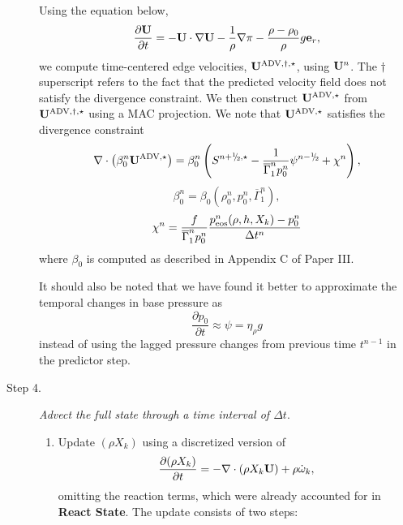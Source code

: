 \documentclass{aastex62}
\newcommand{\sfrac}[2]{\mathchoice
  {\kern0em\raise.5ex\hbox{\the\scriptfont0 #1}\kern-.15em/
   \kern-.15em\lower.25ex\hbox{\the\scriptfont0 #2}}
  {\kern0em\raise.5ex\hbox{\the\scriptfont0 #1}\kern-.15em/
   \kern-.15em\lower.25ex\hbox{\the\scriptfont0 #2}}
  {\kern0em\raise.5ex\hbox{\the\scriptscriptfont0 #1}\kern-.2em/
   \kern-.15em\lower.25ex\hbox{\the\scriptscriptfont0 #2}}
  {#1\!/#2}}
\newcommand{\myhalf}{\sfrac{1}{2}}
\newcommand{\eb}{{\bf{e}}}
\newcommand{\Ub}{{\bf{U}}}
\newcommand{\dt}{\Delta t}
\newcommand{\omegadot}{\dot\omega}
\newcommand{\nph}{{n+\myhalf}}
\newcommand{\uadvone}{\Ub^{\mathrm{ADV},\star}}
\newcommand{\uadvonedag}{\Ub^{\mathrm{ADV},\dagger,\star}}
\begin{document}
\begin{description}
Using the equation below,
%
\begin{equation}
\frac{\partial\Ub}{\partial t} = -\Ub\cdot\nabla\Ub - \frac{1}{\rho}\nabla\pi - \frac{\rho-\rho_0}{\rho}g\eb_r, \label{eq:u_update}
\end{equation}
%
we compute time-centered edge velocities, $\uadvonedag$, using
$\Ub^n$.  The $\dagger$ superscript refers to the
fact that the predicted velocity field does not satisfy the divergence
constraint.  We then construct $\uadvone$ from $\uadvonedag$
using a MAC projection.
We note that $\uadvone$ satisfies the divergence constraint
\begin{equation}
\nabla \cdot \left(\beta_0^n \uadvone\right) = \beta_0^n \left(S^{\nph,\star} - \frac{1}{\overline{\Gamma}_1^np_0^n}\psi^{n-\myhalf} + \chi^n \right),
\end{equation}
\begin{equation}
 \beta_0^n = \beta_0 \left(\rho_0^n, p_0^n, \overline{\Gamma}_1^n\right),
\end{equation}
\begin{equation}
\chi^n = \frac{f}{\overline{\Gamma}_1^n p_0^n}\frac{p_{\rm eos}^n(\rho,h,X_k) - p_0^n}{\Delta t^n}
\end{equation}
where $\beta_0$ is computed as described in Appendix C of Paper III.

It should also be noted that we have found it better to approximate 
the temporal changes in base pressure as 
\begin{equation}
\frac{\partial p_0}{\partial t} \approx \psi = \eta_{\rho} g
\end{equation}
instead of using the lagged pressure changes from previous time $t^{n-1}$ 
in the predictor step.

\item[Step 4.] {\em Advect the full state through a time interval of $\dt.$}

\begin{enumerate}
\renewcommand{\theenumi}{{\bf \Alph{enumi}}}

\item Update $(\rho X_k)$ using a discretized version of
%
\begin{equation}
\frac{\partial(\rho X_k)}{\partial t} = -\nabla\cdot(\rho X_k\Ub) + \rho\omegadot_k,
\end{equation}
%
omitting the reaction terms, which were already
accounted for in {\bf React State}.  The update consists of two steps:


\end{enumerate}
\end{description}
\end{document}
